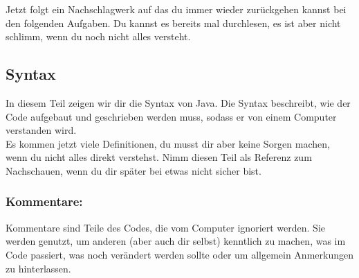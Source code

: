 
\label{ex2}

Jetzt folgt ein Nachschlagwerk auf das du immer wieder zurückgehen kannst bei den folgenden Aufgaben.
Du kannst es bereits mal durchlesen, es ist aber nicht schlimm, wenn du noch nicht alles versteht.

\subsection*{Syntax}
\noindent
In diesem Teil zeigen wir dir die Syntax von Java.
Die Syntax beschreibt, wie der Code aufgebaut und geschrieben werden muss, sodass er von einem Computer verstanden wird.\\
Es kommen jetzt viele Definitionen, du musst dir aber keine Sorgen machen, wenn du nicht alles direkt verstehst.
Nimm diesen Teil als Referenz zum Nachschauen, wenn du dir später bei etwas nicht sicher bist.

\begin{Infobox}

	\subsubsection*{Kommentare:}
	Kommentare sind Teile des Codes, die vom Computer ignoriert werden.
	Sie werden genutzt, um anderen (aber auch dir selbst) kenntlich zu machen, was im Code passiert, was noch verändert werden sollte oder um allgemein Anmerkungen zu hinterlassen.
\end{Infobox}

